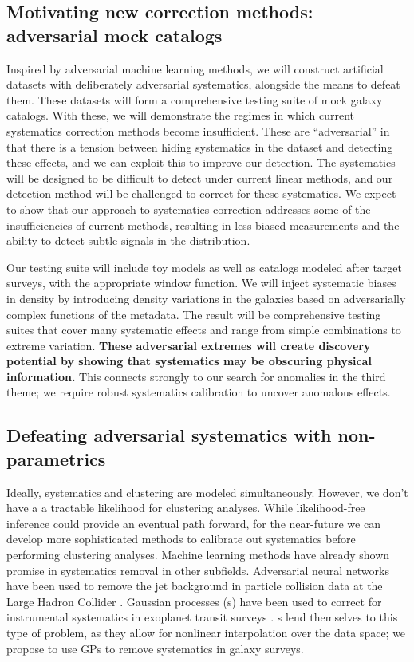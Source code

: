 \documentclass[12pt, fullpage, letterpaper]{article}
\begin{document}
\subsection{Motivating new correction methods: adversarial mock catalogs}

Inspired by adversarial machine learning methods, we will construct artificial datasets with deliberately adversarial systematics, alongside the means to defeat them.
These datasets will form a comprehensive testing suite of mock galaxy catalogs.
With these, we will demonstrate the regimes in which current systematics correction methods become insufficient.
These are ``adversarial'' in that there is a tension between hiding systematics in the dataset and detecting these effects, and we can exploit this to improve our detection.
The systematics will be designed to be difficult to detect under current linear methods, and our detection method will be challenged to correct for these systematics. 
We expect to show that our approach to systematics correction addresses some of the insufficiencies of current methods, resulting in less biased measurements and the ability to detect subtle signals in the distribution.

Our testing suite will include toy models as well as catalogs modeled after target surveys, with the appropriate window function.
We will inject systematic biases in density by introducing density variations in the galaxies based on adversarially complex functions of the metadata.
The result will be comprehensive testing suites that cover many systematic effects and range from simple combinations to extreme variation.
\textbf{These adversarial extremes will create discovery potential by showing that systematics may be obscuring physical information.}
This connects strongly to our search for anomalies in the third theme; we require robust systematics calibration to uncover anomalous effects.

\subsection{Defeating adversarial systematics with non-parametrics}

Ideally, systematics and clustering are modeled simultaneously. 
However, we don't have a a tractable likelihood for clustering analyses.
While likelihood-free inference could provide an eventual path forward, for the near-future we can develop more sophisticated methods to calibrate out systematics before performing clustering analyses.
Machine learning methods have already shown promise in systematics removal in other subfields.
Adversarial neural networks have been used to remove the jet background in particle collision data at the Large Hadron Collider \citep{Shimmin2017}.
Gaussian processes (\GP s) have been used to correct for instrumental systematics in exoplanet transit surveys \citep{Gibson2012, Aigrain2016}. 
\GP s lend themselves to this type of problem, as they allow for nonlinear interpolation over the data space; we propose to use GPs to remove systematics in galaxy surveys.
\end{document}
